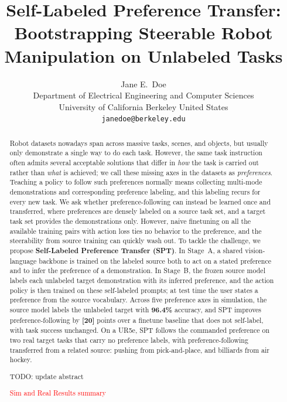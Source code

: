 \documentclass{article}
\title{Self-Labeled Preference Transfer: Bootstrapping Steerable Robot Manipulation on Unlabeled Tasks}
\author{
  Jane E.~Doe\\
  Department of Electrical Engineering and Computer Sciences\\
  University of California Berkeley
  United States\\
  \texttt{janedoe@berkeley.edu}
}
\newcommand{\YZ}[1]{{\color{blue}#1}}
\begin{document}
\maketitle


\begin{abstract}
Robot datasets nowadays span across massive tasks, scenes, and objects, but usually only demonstrate a single way to do each task.
However, the same task instruction often admits several acceptable solutions that differ in \emph{how} the task is carried out rather than \emph{what} is achieved; we call these missing axes in the datasets as \emph{preferences}.
Teaching a policy to follow such preferences normally means collecting multi-mode demonstrations and corresponding preference labeling, and this labeling recurs for every new task.
We ask whether preference-following can instead be learned once and transferred, where preferences are densely labeled on a source task set, and a target task set provides the demonstrations only.
However, naive finetuning on all the available training pairs with action loss ties no behavior to the preference, and the steerability from source training can quickly wash out.
To tackle the challenge, we propose \textbf{Self-Labeled Preference Transfer (SPT)}.
In Stage~A, a shared vision-language backbone is trained on the labeled source both to act on a stated preference and to infer the preference of a demonstration.
In Stage~B, the frozen source model labels each unlabeled target demonstration with its inferred preference, and the action policy is then trained on these self-labeled prompts; at test time the user states a preference from the source vocabulary.
Across five preference axes in simulation, the source model labels the unlabeled target with \textbf{96.4\%} accuracy, and SPT improves preference-following by \textbf{[20]} points over a finetune baseline that does not self-label, with task success unchanged.
On a UR5e, SPT follows the commanded preference on two real target tasks that carry no preference labels, with preference-following transferred from a related source: pushing from pick-and-place, and billiards from air hockey.

\YZ{TODO: update abstract}

\textcolor{red}{Sim and Real Results summary}

\end{abstract}
\end{document}
